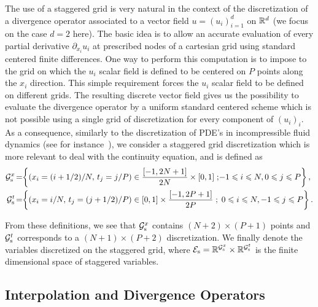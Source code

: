 The use of a staggered grid is very natural in the context of the discretization of a divergence operator associated to a vector field $u=(u_i)_{i=1}^d$ on $\mathbb{R}^d$ (we focus on the case $d=2$ here). The basic idea is to allow an accurate evaluation of every partial derivative $\partial_{x_i} u_i$ at prescribed nodes of a cartesian grid  using standard centered finite differences. One way to perform this computation is to impose to the grid on which the $u_i$ scalar field is defined to be centered on $P$ points along the $x_i$ direction. This simple requirement forces the $u_i$ scalar field to be defined on different grids. The resulting  discrete vector field gives us the possibility to evaluate the divergence operator by a uniform standard centered scheme which is not possible using a single grid of discretization for every component of $(u_i)_i$. As a consequence, similarly to the discretization of PDE's in incompressible fluid dynamics (see for instance~\cite{Harlow1965}), we consider a staggered grid discretization which is more relevant to deal with the continuity equation, and is defined as
\begin{align*}
	\Gs^x \hspace{-0.05cm}&=\hspace{-0.1cm} \enscond{ \left(x_{i}=(i+1/2)/N ,\, t_j=j/P\right) \in \frac{[-1,2N+1]}{2N}\times[0,1]} {\hspace{-0.15cm}-1 \leq i \leq  N, 0 \leq j \leq  P },\\
	\Gs^t \hspace{-0.05cm}&=\hspace{-0.1cm} \enscond{ \left(x_i=i/N,\, t_{j}=(j+1/2)/P\right) \in [0,1]\times\frac{[-1,2P+1]}{2P}}{ 0 \leq i \leq  N, -1 \leq j \leq  P }.
\end{align*}

From these definitions, we see that $\mathcal{G}_{\text{s}}^x$ contains $(N+2)\times(P+1)$ points and $\mathcal{G}_{\text{s}}^t$ corresponds to a $(N+1)\times(P+2)$ discretization. We finally denote 
the variables discretized on the staggered grid, where $\mathcal{E}_{\text{s}} = \mathbb{R}^{\mathcal{G}_{\text{s}}^x} \times \mathbb{R}^{\mathcal{G}_{\text{s}}^t}$ is the finite dimensional space of staggered variables. 


\subsection{Interpolation  and Divergence Operators}

